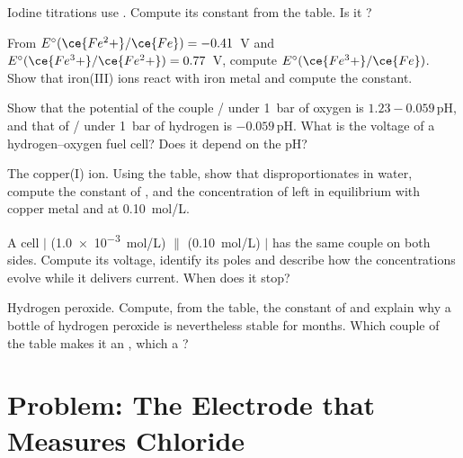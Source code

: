 \begin{exercise}[$\star\star$]\label{exo:b1:nernst:7}
Iodine titrations use . Compute its
constant from the table. Is it ?
\end{exercise}

\begin{exercise}[$\star\star$]\label{exo:b1:nernst:8}
From $E^\circ(\ce{Fe^2+}/\ce{Fe}) = -0.41$~V and $E^\circ(\ce{Fe^3+}/\ce{Fe^2+})
= 0.77$~V, compute $E^\circ(\ce{Fe^3+}/\ce{Fe})$. Show that iron(III) ions
react with iron metal and compute the constant.
\end{exercise}

\begin{exercise}[$\star\star$]\label{exo:b1:nernst:9}
Show that the potential of the couple / under \qty{1}{bar}
of oxygen is $1.23 - 0.059\,\mathrm{pH}$, and that of /
under \qty{1}{bar} of hydrogen is $-0.059\,\mathrm{pH}$. What is the
voltage of a hydrogen--oxygen fuel cell? Does it depend on the pH?
\end{exercise}

\begin{exercise}[$\star\star\star$]\label{exo:b1:nernst:10}
The copper(I) ion. Using the table, show that  disproportionates
in water, compute the constant of , and the
concentration of  left in equilibrium with copper metal and
 at \qty{0.10}{mol/L}.
\end{exercise}

\begin{exercise}[$\star\star\star$]\label{exo:b1:nernst:11}
A cell  $|$  (\qty{1.0e-3}{mol/L}) $\|$ 
(\qty{0.10}{mol/L}) $|$  has the same couple on both sides.
Compute its voltage, identify its poles and describe how the
concentrations evolve while it delivers current. When does it stop?
\end{exercise}

\begin{exercise}[$\star\star\star$]\label{exo:b1:nernst:12}
Hydrogen peroxide. Compute, from the table, the constant of
 and explain why a bottle of hydrogen peroxide is
nevertheless stable for months. Which couple of the table makes it an
, which a ?
\end{exercise}

\section{Problem: The Electrode that Measures Chloride}

